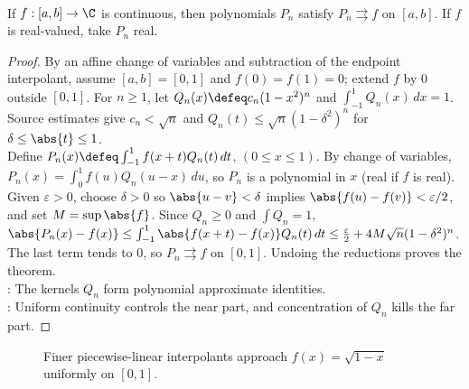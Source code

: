\begin{theorem} \label{thm:weierstrass-polynomial-approximation}\label{thm:power-approx-fourier-main-source-todo} \\
If $f:[a,b]\to\C$ is continuous, then polynomials $P_n$ satisfy $P_n\rightrightarrows f$ on $[a,b]$. If $f$ is real-valued, take $P_n$ real.
\begin{proof}
By an affine change of variables and subtraction of the endpoint interpolant, assume $[a,b]=[0,1]$ and $f(0)=f(1)=0$; extend $f$ by $0$ outside $[0,1]$. For $n\geq1$, let $Q_n(x)\defeq c_n(1-x^2)^n$ and $\int_{-1}^{1}Q_n(x)\,dx=1$.\\
Source estimates give $c_n<\sqrt n$ and $Q_n(t)\leq\sqrt n(1-\delta^2)^n$ for $\delta\leq\abs{t}\leq1$.\\
Define $P_n(x)\defeq\int_{-1}^{1}f(x+t)Q_n(t)\,dt$, $(0\leq x\leq1)$. By change of variables, $P_n(x)=\int_0^1 f(u)Q_n(u-x)\,du$, so $P_n$ is a polynomial in $x$ (real if $f$ is real). Given $\varepsilon>0$, choose $\delta>0$ so $\abs{u-v}<\delta$ implies $\abs{f(u)-f(v)}<\varepsilon/2$, and set $M=\sup\abs{f}$. Since $Q_n\geq0$ and $\int Q_n=1$, $\abs{P_n(x)-f(x)} \leq \int_{-1}^{1}\abs{f(x+t)-f(x)}Q_n(t)\,dt \leq \frac{\varepsilon}{2}+4M\sqrt n(1-\delta^2)^n$.\\
The last term tends to $0$, so $P_n\rightrightarrows f$ on $[0,1]$. Undoing the reductions proves the theorem.\\
: The kernels $Q_n$ form polynomial approximate identities.\\
: Uniform continuity controls the near part, and concentration of $Q_n$ kills the far part.
\end{proof}
\end{theorem}

\begin{figure}[H]
  \centering
  
  \caption{Finer piecewise-linear interpolants approach $f(x)=\sqrt{1-x}$ uniformly on $[0,1]$.}
  \label{fig:polygonal-approximation-sqrt-one-minus-x}
\end{figure}

